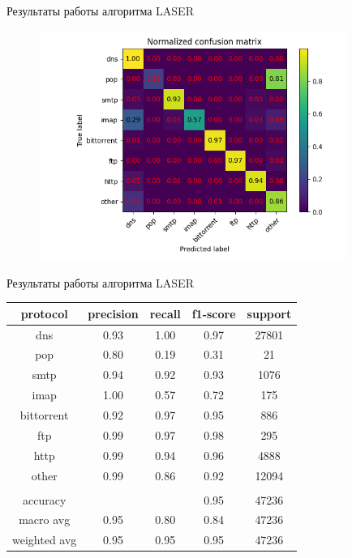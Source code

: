 \documentclass[10pt]{beamer}
\begin{document}
\begin{frame}{Результаты работы алгоритма LASER}
    \begin{figure}
        \begin{adjustwidth}{-2em}{-2em}
            \centering
            \includegraphics[width=27em]{results/laser_no_filtered/Normalized_confusion_matrix.png}
        \end{adjustwidth}
    \end{figure}
\end{frame}

\begin{frame}{Результаты работы алгоритма LASER}
    \begin{table}[]
        \begin{tabular}{|c|c|c|c|c|}
        \hline
        protocol     & precision & recall & f1-score & support \\ \hline
        dns          & 0.93      & 1.00   & 0.97     & 27801   \\ \hline
        pop          & 0.80      & 0.19   & 0.31     & 21      \\ \hline
        smtp         & 0.94      & 0.92   & 0.93     & 1076    \\ \hline
        imap         & 1.00      & 0.57   & 0.72     & 175     \\ \hline
        bittorrent   & 0.92      & 0.97   & 0.95     & 886     \\ \hline
        ftp          & 0.99      & 0.97   & 0.98     & 295     \\ \hline
        http         & 0.99      & 0.94   & 0.96     & 4888    \\ \hline
        other        & 0.99      & 0.86   & 0.92     & 12094   \\ \hline
                     &           &        &          &         \\ \hline
        accuracy     &           &        & 0.95     & 47236   \\ \hline
        macro avg    & 0.95      & 0.80   & 0.84     & 47236   \\ \hline
        weighted avg & 0.95      & 0.95   & 0.95     & 47236   \\ \hline
        \end{tabular}
        \end{table}
\end{frame}
\end{document}
